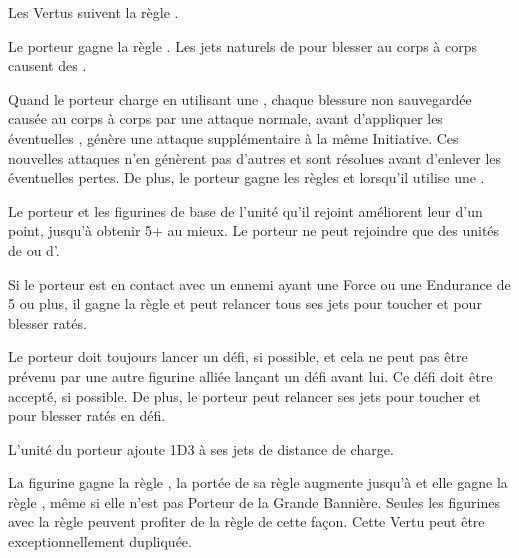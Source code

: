 \closearmyspecialrules







\vspace{0.5cm}

\begin{center}Les Vertus suivent la règle \oneperarmy{}.\end{center}

\begin{multicols}{2}\raggedcolumns
\startpricelistNSP

 Le porteur gagne la règle . Les jets naturels de  pour blesser au corps à corps causent des \multiplewounds{\ordnance}{}.

 Quand le porteur charge en utilisant une \lance{}, chaque blessure non sauvegardée causée au corps à corps par une attaque normale, avant d'appliquer les éventuelles \multiplewounds{}{}, génère une attaque supplémentaire à la même Initiative. Ces nouvelles attaques n'en génèrent pas d'autres et sont résolues avant d'enlever les éventuelles pertes. De plus, le porteur gagne les règles \devastatingcharge{} et \thunderouscharge{} lorsqu'il utilise une \lance{}.

 Le porteur et les figurines de base de l'unité qu'il rejoint améliorent leur \wardsave{} d'un point, jusqu'à obtenir 5+ au mieux. Le porteur ne peut rejoindre que des unités de \cavalry{} ou d'\infantry{}.

 Si le porteur est en contact avec un ennemi ayant une Force ou une Endurance de 5 ou plus, il gagne la règle \stubborn{} et peut relancer tous ses jets pour toucher et pour blesser ratés.

\columnbreak
{} Le porteur doit toujours lancer un défi, si possible, et cela ne peut pas être prévenu par une autre figurine alliée lançant un défi avant lui. Ce défi doit être accepté, si possible. De plus, le porteur peut relancer ses jets pour toucher et pour blesser ratés en défi.

 L'unité du porteur ajoute 1D3 à ses jets de distance de charge.

 La figurine gagne la règle \insignificant{}, la portée de sa règle \inspiringpresence{} augmente jusqu'à  et elle gagne la règle \holdyourground{}, même si elle n'est pas Porteur de la Grande Bannière. Seules les figurines avec la règle \insignificant{} peuvent profiter de la règle \holdyourground{} de cette façon. Cette Vertu peut être exceptionnellement dupliquée.

\endpricelistNSP
\end{multicols}

